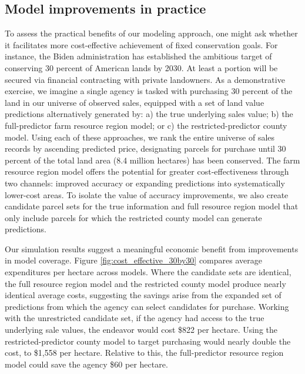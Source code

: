 \documentclass[12pt]{article}
\begin{document}
\subsection{Model improvements in practice} 

To assess the practical benefits of our modeling approach, one might ask whether it facilitates more cost-effective achievement of fixed conservation goals. For instance, the Biden administration has established the ambitious target of conserving 30 percent of American lands by 2030. At least a portion will be secured via financial contracting with private landowners. As a demonstrative exercise, we imagine a single agency is tasked with purchasing 30 percent of the land in our universe of observed sales, equipped with a set of land value predictions alternatively generated by: a) the true underlying sales value; b) the full-predictor farm resource region model; or c) the restricted-predictor county model. Using each of these approaches, we rank the entire universe of sales records by ascending predicted price, designating parcels for purchase until 30 percent of the total land area (8.4 million hectares) has been conserved. The farm resource region model offers the potential for greater cost-effectiveness through two channels: improved accuracy or expanding predictions into systematically lower-cost areas. To isolate the value of accuracy improvements, we also create candidate parcel sets for the true information and full resource region model that only include parcels for which the restricted county model can generate predictions.

Our simulation results suggest a meaningful economic benefit from improvements in model coverage. Figure \ref{fig:cost_effective_30by30} compares average expenditures per hectare across models. Where the candidate sets are identical, the full resource region model and the restricted county model produce nearly identical average costs, suggesting the savings arise from the expanded set of predictions from which the agency can select candidates for purchase. Working with the unrestricted candidate set, if the agency had access to the true underlying sale values, the endeavor would cost \$822 per hectare. Using the restricted-predictor county model to target purchasing would nearly double the cost, to \$1,558 per hectare. Relative to this, the full-predictor resource region model could save the agency \$60 per hectare. 
\end{document}
